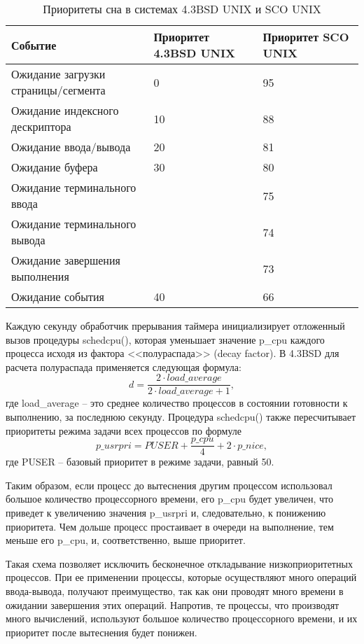 \begin{table}[h]
	\caption{Приоритеты сна в системах 4.3BSD UNIX и SCO UNIX}
	\begin{center}
		\begin{tabular}{|l|p{75pt}|p{75pt}|} 
			\hline
			\textbf{Событие} & \textbf{Приоритет 4.3BSD UNIX} & \textbf{Приоритет SCO UNIX}\\
			\hline
			{Ожидание загрузки страницы/сегмента} & 0 & 95\\
			\hline
			{Ожидание индексного дескриптора} & 10 & 88\\
			\hline
			{Ожидание ввода/вывода} & 20 & 81 \\
			\hline
			{Ожидание буфера} & 30 & 80\\
			\hline
			{Ожидание терминального ввода} &    & 75\\
			\hline
			{Ожидание терминального вывода} &    & 74\\
			\hline
			{Ожидание завершения выполнения} &    & 73\\
			\hline
			{Ожидание события} & 40 & 66\\
			\hline
		\end{tabular}
	\end{center}
	\label{tbl:sleeppriority}
\end{table}


Каждую секунду обработчик прерывания таймера инициализирует отложенный вызов процедуры {\ttfamily schedcpu()}, которая уменьшает значение {\ttfamily p{\_}cpu} каждого процесса исходя из фактора <<полураспада>> (decay factor). В {\ttfamily 4.3BSD} для расчета полураспада применяется следующая формула:
\[
d = \frac{2\cdot load{\_}average}{2\cdot load{\_}average + 1},
\]
где  {\ttfamily load{\_}average} -- это среднее количество процессов в состоянии готовности к выполнению, за последнюю секунду. Процедура {\ttfamily schedcpu()} также пересчитывает приоритеты режима задачи всех процессов по формуле
\[
{p\_usrpri} = PUSER + \frac{p{\_}cpu}{4} + 2\cdot {p{\_}nice},
\]
где {\ttfamily PUSER} -- базовый приоритет в режиме задачи, равный 50.

Таким образом, если процесс до вытеснения другим процессом использовал большое количество процессорного времени, его {\ttfamily p{\_}cpu} будет увеличен, что приведет к увеличению значения {\ttfamily p{\_}usrpri} и, следовательно, к понижению приоритета. Чем дольше процесс простаивает в очереди на выполнение, тем меньше его {\ttfamily p{\_}cpu}, и, соответственно, выше приоритет. 

Такая схема позволяет исключить бесконечное откладывание низкоприоритетных процессов. При ее применении процессы, которые осуществляют много операций ввода-вывода, получают преимущество, так как они проводят много времени в ожидании завершения этих операций. Напротив, те процессы, что производят много вычислений, используют большое количество процессорного времени, и их приоритет после вытеснения будет понижен. 

